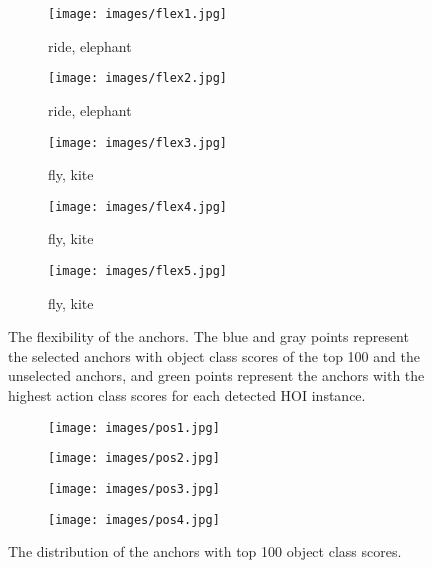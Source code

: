\documentclass[10pt,twocolumn,letterpaper]{article}
\begin{document}
\begin{figure*}
  \centering
  \begin{subfigure}{0.18\linewidth}
    \centering
    \texttt{[image: images/flex1.jpg]}
    \caption{ride, elephant}
    \label{fig:short-a}
  \end{subfigure}
  \begin{subfigure}{0.18\linewidth}
    \centering
    \texttt{[image: images/flex2.jpg]}
    \caption{ride, elephant}
    \label{fig:short-b}
  \end{subfigure}
  \begin{subfigure}{0.18\linewidth}
    \centering
    \texttt{[image: images/flex3.jpg]}
    \caption{fly, kite}
    \label{fig:short-c}
  \end{subfigure}
  \begin{subfigure}{0.18\linewidth}
    \centering
    \texttt{[image: images/flex4.jpg]}
    \caption{fly, kite}
    \label{fig:short-d}
  \end{subfigure}
  \begin{subfigure}{0.18\linewidth}
    \centering
    \texttt{[image: images/flex5.jpg]}
    \caption{fly, kite}
    \label{fig:short-e}
  \end{subfigure}
  \caption{The flexibility of the anchors. The blue and gray points represent the selected anchors with object class scores of the top 100 and the unselected anchors, and green points represent the anchors with the highest action class scores for each detected HOI instance.}
  \label{fig:anchor-flex}
\end{figure*}
\begin{figure*}
  \centering
  \begin{subfigure}{0.27\linewidth}
    \centering
    \texttt{[image: images/pos1.jpg]}
    \caption{}
    \label{fig:short2-a}
  \end{subfigure}
  \begin{subfigure}{0.27\linewidth}
    \centering
    \texttt{[image: images/pos2.jpg]}
    \caption{}
    \label{fig:short2-b}
  \end{subfigure}
  \begin{subfigure}{0.27\linewidth}
    \centering
    \texttt{[image: images/pos3.jpg]}
    \caption{}
    \label{fig:short2-c}
  \end{subfigure}
  \begin{subfigure}{0.15\linewidth}
    \centering
    \texttt{[image: images/pos4.jpg]}
    \caption{}
    \label{fig:short2-d}
  \end{subfigure}
  \caption{The distribution of the anchors with top 100 object class scores.}
  \label{fig:anchor-top100}
\end{figure*}
\end{document}

